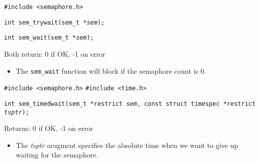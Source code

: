 \documentclass[]{article}
\newcommand{\code}{\texttt}
\begin{document}
\code{\#include <semaphore.h>}

\code{int sem\_trywait(sem\_t *\emph{sem});}

\code{int sem\_wait(sem\_t *\emph{sem});}

Both return: 0 if OK, -1 on error

\begin{itemize}
\item The \code{sem\_wait} function will block if the semaphore count is 0.
\end{itemize}

\code{\#include <semaphore.h>}
\code{\#include <time.h>}

\code{int sem\_timedwait(sem\_t *restrict \emph{sem}, const struct timespec
*restrict \emph{tsptr});}

Returns: 0 if OK, -1 on error

\begin{itemize}
\item The \emph{tsptr} arugment specifies the absolute time when we want to give
up waiting for the semaphore.
\end{itemize}
\end{document}
